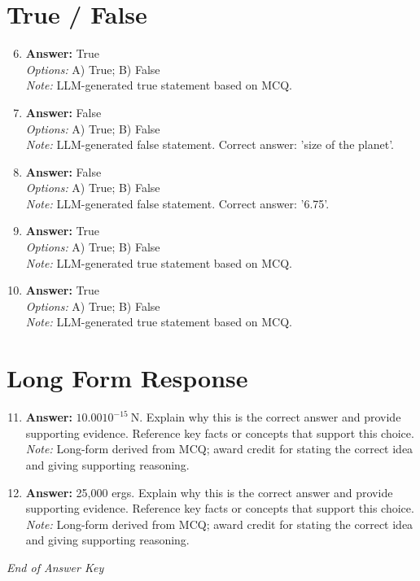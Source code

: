 \documentclass[12pt]{article}
\begin{document}
\section*{True / False}
\begin{enumerate}[label=\arabic*.]
\setcounter{enumi}{5}
\item \textbf{Answer:} True
\\ \textit{Options:} A) True; B) False
\\ \textit{Note:} LLM-generated true statement based on MCQ.
\item \textbf{Answer:} False
\\ \textit{Options:} A) True; B) False
\\ \textit{Note:} LLM-generated false statement. Correct answer: 'size of the planet'.
\item \textbf{Answer:} False
\\ \textit{Options:} A) True; B) False
\\ \textit{Note:} LLM-generated false statement. Correct answer: '6.75'.
\item \textbf{Answer:} True
\\ \textit{Options:} A) True; B) False
\\ \textit{Note:} LLM-generated true statement based on MCQ.
\item \textbf{Answer:} True
\\ \textit{Options:} A) True; B) False
\\ \textit{Note:} LLM-generated true statement based on MCQ.
\end{enumerate}

\section*{Long Form Response}
\begin{enumerate}[label=\arabic*.]
\setcounter{enumi}{10}
\item \textbf{Answer:} $10.00$$10^{-15} \mathrm{~N}$. Explain why this is the correct answer and provide supporting evidence. Reference key facts or concepts that support this choice.
\\ \textit{Note:} Long-form derived from MCQ; award credit for stating the correct idea and giving supporting reasoning.
\item \textbf{Answer:} 25,000 ergs. Explain why this is the correct answer and provide supporting evidence. Reference key facts or concepts that support this choice.
\\ \textit{Note:} Long-form derived from MCQ; award credit for stating the correct idea and giving supporting reasoning.
\end{enumerate}

\vfill
\noindent\textit{End of Answer Key}
\end{document}
